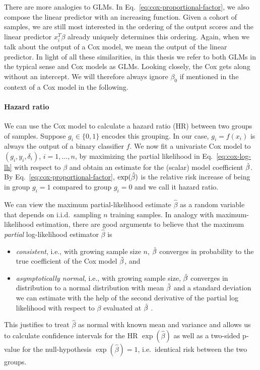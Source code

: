 There are more analogies to GLMs. In Eq.\ \eqref{eq:cox-proportional-factor}, we also compose the 
linear predictor with an increasing function. Given a cohort of samples, we are still most 
interested in the ordering of the output scores and the linear predictor $x_i^T \beta$ already 
uniquely determines this ordering. Again, when we talk about the output of a Cox model, we mean the 
output of the linear predictor. In light of all these similarities,
in this thesis we refer to both GLMs in the typical sense and Cox models as GLMs. Looking closely,
the Cox gets along without an intercept. We will therefore always ignore $\beta_0$ if mentioned in 
the context of a Cox model in the following.

\paragraph{Hazard ratio}

We can use the Cox model to calculate a hazard ratio (HR) between two groups of samples. Suppose 
$g_i \in \{0, 1\}$ encodes this grouping. In our case, $g_i = f(x_i)$ is always the output of 
a binary classifier $f$. We now fit a univariate Cox model to $(g_i, y_i, \delta_i)$, $i = 1, 
\ldots, n$, by maximizing 
the partial likelihood in Eq.\ \eqref{eq:cox-log-lh} with respect to $\beta$ and obtain an estimate
for the (scalar) model coefficient $\hat{\beta}$. By Eq.\ \eqref{eq:cox-proportional-factor}, 
$\exp(\hat{\beta})$ is the relative risk increase of being in group $g_i = 1$ compared to group 
$g_i = 0$ and we call it hazard ratio.

We can view the maximum partial-likelihood estimate $\hat{\beta}$ as a random variable that depends 
on i.i.d.\ sampling $n$ training samples. In analogy with maximum-likelihood estimation, there are 
good arguments to believe that the maximum \textit{partial} log-likelihood estimator $\hat{\beta}$
is
\begin{itemize}  
    \item \textit{consistent}, i.e., with growing sample size $n$, $\hat{\beta}$ converges in 
        probability to the true coefficient of the Cox model $\tilde{\beta}$, and
    \item \textit{asymptotically normal}, i.e., with growing sample size, $\hat{\beta}$ converges 
        in distribution to a normal distribution with mean $\tilde{\beta}$ and a standard deviation we 
        can estimate with the help of the second derivative of the partial log likelihood with 
        respect to $\beta$ evaluated at $\hat{\beta}$ \cite[8.1--8.4]{klein03}.
\end{itemize}
This justifies to treat $\hat{\beta}$ as normal with known mean and variance and allows us to
calculate confidence intervals for the HR $\exp(\hat{\beta})$ as well as a two-sided p-value for 
the null-hypothesis $\exp(\hat{\beta}) = 1$, i.e.\ identical risk between the two groups. 

